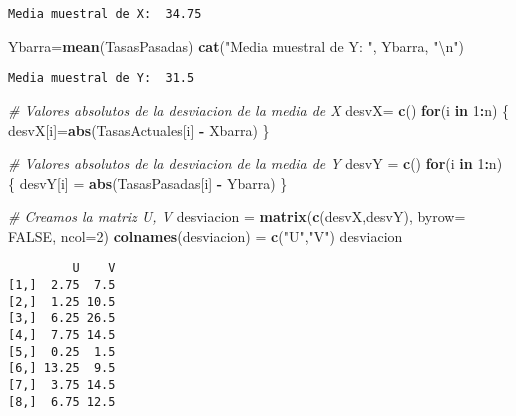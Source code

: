 \documentclass[a4paper,oneside,openany]{book}
\newenvironment{Shaded}{\begin{snugshade}}{\end{snugshade}}
\newcommand{\KeywordTok}[1]{\textcolor[rgb]{0.13,0.29,0.53}{\textbf{#1}}}
\newcommand{\DataTypeTok}[1]{\textcolor[rgb]{0.13,0.29,0.53}{#1}}
\newcommand{\DecValTok}[1]{\textcolor[rgb]{0.00,0.00,0.81}{#1}}
\newcommand{\CharTok}[1]{\textcolor[rgb]{0.31,0.60,0.02}{#1}}
\newcommand{\StringTok}[1]{\textcolor[rgb]{0.31,0.60,0.02}{#1}}
\newcommand{\CommentTok}[1]{\textcolor[rgb]{0.56,0.35,0.01}{\textit{#1}}}
\newcommand{\OtherTok}[1]{\textcolor[rgb]{0.56,0.35,0.01}{#1}}
\newcommand{\ControlFlowTok}[1]{\textcolor[rgb]{0.13,0.29,0.53}{\textbf{#1}}}
\newcommand{\OperatorTok}[1]{\textcolor[rgb]{0.81,0.36,0.00}{\textbf{#1}}}
\newcommand{\NormalTok}[1]{#1}
\begin{document}
\begin{verbatim}
Media muestral de X:  34.75 
\end{verbatim}

\begin{Shaded}
\begin{Highlighting}[]
\NormalTok{Ybarra=}\KeywordTok{mean}\NormalTok{(TasasPasadas)}
\KeywordTok{cat}\NormalTok{(}\StringTok{"Media muestral de Y: "}\NormalTok{, Ybarra, }\StringTok{"}\CharTok{\textbackslash{}n}\StringTok{"}\NormalTok{)}
\end{Highlighting}
\end{Shaded}

\begin{verbatim}
Media muestral de Y:  31.5 
\end{verbatim}

\begin{Shaded}
\begin{Highlighting}[]
\CommentTok{# Valores absolutos de la desviacion de la media de X}
\NormalTok{desvX=}\StringTok{ }\KeywordTok{c}\NormalTok{()}
\ControlFlowTok{for}\NormalTok{(i }\ControlFlowTok{in} \DecValTok{1}\OperatorTok{:}\NormalTok{n) \{}
\NormalTok{  desvX[i]=}\KeywordTok{abs}\NormalTok{(TasasActuales[i] }\OperatorTok{-}\StringTok{ }\NormalTok{Xbarra)}
\NormalTok{\}}

\CommentTok{# Valores absolutos de la desviacion de la media de Y}
\NormalTok{desvY =}\StringTok{ }\KeywordTok{c}\NormalTok{()}
\ControlFlowTok{for}\NormalTok{(i }\ControlFlowTok{in} \DecValTok{1}\OperatorTok{:}\NormalTok{n) \{}
\NormalTok{  desvY[i] =}\StringTok{ }\KeywordTok{abs}\NormalTok{(TasasPasadas[i] }\OperatorTok{-}\StringTok{ }\NormalTok{Ybarra)}
\NormalTok{\}}

\CommentTok{# Creamos la matriz U, V}
\NormalTok{desviacion =}\StringTok{ }\KeywordTok{matrix}\NormalTok{(}\KeywordTok{c}\NormalTok{(desvX,desvY), }\DataTypeTok{byrow=} \OtherTok{FALSE}\NormalTok{, }\DataTypeTok{ncol=}\DecValTok{2}\NormalTok{)}
\KeywordTok{colnames}\NormalTok{(desviacion) =}\StringTok{ }\KeywordTok{c}\NormalTok{(}\StringTok{"U"}\NormalTok{,}\StringTok{"V"}\NormalTok{)}
\NormalTok{desviacion}
\end{Highlighting}
\end{Shaded}

\begin{verbatim}
         U    V
[1,]  2.75  7.5
[2,]  1.25 10.5
[3,]  6.25 26.5
[4,]  7.75 14.5
[5,]  0.25  1.5
[6,] 13.25  9.5
[7,]  3.75 14.5
[8,]  6.75 12.5
\end{verbatim}
\end{document}
